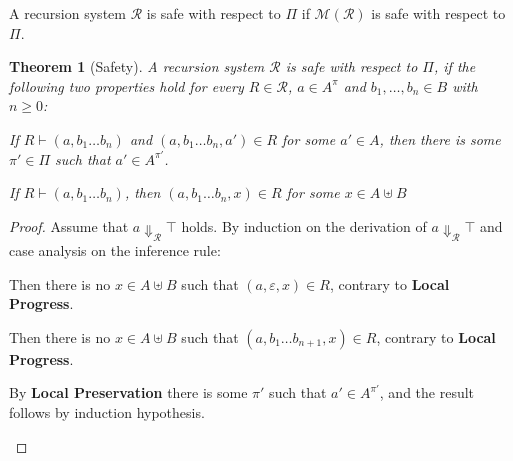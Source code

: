 \documentclass[a4paper,final,preprint,sort&compress]{elsarticle}
\newtheorem{theorem}[definition]{Theorem}
\newtheorem{lemma}[definition]{Lemma}
\newcommand{\M}{\ensuremath{\mathcal{M}}}
\newcommand{\R}{\ensuremath{\mathcal{R}}}
\DeclareMathOperator{\dom}{dom}
\begin{document}
A recursion system $\R$ is safe with respect to $\Pi$ if $\M(\R)$ is safe with
respect to $\Pi$.



\begin{theorem}[Safety]
  A recursion system $\R$ is safe with respect to $\Pi$, if the following two properties 
  hold for every $R \in \R$, $a \in A^\pi$ and $b_1,\ldots,b_n \in B$ with $n \ge 0$:
  \begin{description}[labelindent=\parindent,style=nextline]
  \item[Local Preservation]

    If \mbox{$R \vdash (a,b_1 \ldots b_n)$} and \mbox{$(a,b_1 \ldots b_n,a') \in R$} for
    some $a' \in A$, then there is some $\pi' \in \Pi$ such that $a' \in A^{\pi'}$.

  \item[Local Progress]

    If \mbox{$R \vdash (a,b_1 \ldots b_n)$}, then \mbox{$(a,b_1 \ldots b_n,x) \in R$} for
    some \mbox{$x \in A \uplus B$}

  \end{description}
\end{theorem}

\begin{proof}
  Assume that $a \Downarrow_\R \top$ holds. By induction on the derivation of $a \Downarrow_\R \top$ and
  case analysis on the inference rule:
  \begin{description}[font=\sc,labelindent=\parindent,style=nextline]
  \item[(Err-1)]

    Then there is no \mbox{$x \in A \uplus B$} such that \mbox{$(a,\varepsilon,x) \in R$},
    contrary to \textbf{Local Progress}.

  \item[(Err-2)]

    Then there is no \mbox{$x \in A \uplus B$} such that \mbox{$(a,b_1 \ldots b_{n+1},x) \in R$},
    contrary to \textbf{Local Progress}.

  \item[(Err-3)]

    By \textbf{Local Preservation} there is some $\pi'$ such that $a' \in A^{\pi'}$, and the result
    follows by induction hypothesis.
    
  \end{description}
\end{proof}
\end{document}
